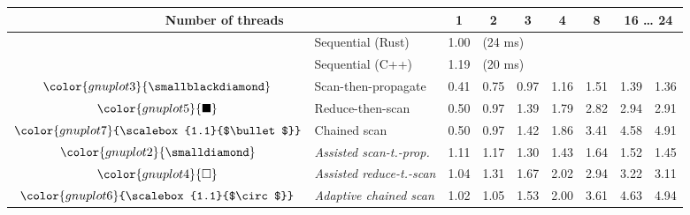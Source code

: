 \begin{tabular}{clrrrrrrr}
\toprule
\multicolumn{2}{c}{\textbf{Number of threads}} & \multicolumn{1}{c}{\textbf{ 1 }} & \multicolumn{1}{c}{\textbf{ 2 }} & \multicolumn{1}{c}{\textbf{ 3 }} & \multicolumn{1}{c}{\textbf{ 4 }} & \multicolumn{1}{c}{\textbf{ 8 }} & \multicolumn{2}{c}{\textbf{ 16 } \dots \textbf{ 24 }} \\
\midrule
& Sequential (Rust) & \multicolumn{1}{r}{ 1.00 } & \multicolumn{ 6 }{l}{(24 ms)} \\
& Sequential (C++) & \multicolumn{1}{r}{ 1.19 } & \multicolumn{ 6 }{l}{(20 ms)} \\
\rowcolor{gnuplot3!10}$\color{gnuplot3}{\smallblackdiamond}$ & Scan-then-propagate & \cellcolor{gnuplot3!10} 0.41 & \cellcolor{gnuplot3!10} 0.75 & \cellcolor{gnuplot3!10} 0.97 & \cellcolor{gnuplot3!10} 1.16 & \cellcolor{gnuplot3!10} 1.51 & \cellcolor{gnuplot3!10} 1.39 & \cellcolor{gnuplot3!10} 1.36 \\
\rowcolor{gnuplot5!10}$\color{gnuplot5}{\blacksquare}$ & Reduce-then-scan & \cellcolor{gnuplot5!10} 0.50 & \cellcolor{gnuplot5!10} 0.97 & \cellcolor{gnuplot5!10} 1.39 & \cellcolor{gnuplot5!10} 1.79 & \cellcolor{gnuplot5!10} 2.82 & \cellcolor{gnuplot5!10} 2.94 & \cellcolor{gnuplot5!10} 2.91 \\
\rowcolor{gnuplot7!10}$\color{gnuplot7}{\scalebox{1.1}{$\bullet$}}$ & Chained scan & \cellcolor{gnuplot7!10} 0.50 & \cellcolor{gnuplot7!10} 0.97 & \cellcolor{gnuplot7!10} 1.42 & \cellcolor{gnuplot7!10} 1.86 & \cellcolor{gnuplot7!10} 3.41 & \cellcolor{gnuplot7!10} 4.58 & \cellcolor{gnuplot7!10} 4.91 \\
\rowcolor{gnuplot2!30}$\color{gnuplot2}{\smalldiamond}$ & \textit{Assisted scan-t.-prop.} & \cellcolor{gnuplot2!30} 1.11 & \cellcolor{gnuplot2!30} 1.17 & \cellcolor{gnuplot2!30} 1.30 & \cellcolor{gnuplot2!30} 1.43 & \cellcolor{gnuplot2!30} 1.64 & \cellcolor{gnuplot2!30} 1.52 & \cellcolor{gnuplot2!30} 1.45 \\
\rowcolor{gnuplot4!30}$\color{gnuplot4}{\square}$ & \textit{Assisted reduce-t.-scan} & \cellcolor{gnuplot4!30} 1.04 & \cellcolor{gnuplot4!30} 1.31 & \cellcolor{gnuplot4!30} 1.67 & \cellcolor{gnuplot4!30} 2.02 & \cellcolor{gnuplot4!30} 2.94 & \cellcolor{gnuplot4!30} 3.22 & \cellcolor{gnuplot4!30} 3.11 \\
\rowcolor{gnuplot6!30}$\color{gnuplot6}{\scalebox{1.1}{$\circ$}}$ & \textit{Adaptive chained scan} & \cellcolor{gnuplot6!30} 1.02 & \cellcolor{gnuplot6!30} 1.05 & \cellcolor{gnuplot6!30} 1.53 & \cellcolor{gnuplot6!30} 2.00 & \cellcolor{gnuplot6!30} 3.61 & \cellcolor{gnuplot6!30} 4.63 & \cellcolor{gnuplot6!30} 4.94 \\

\end{tabular}
